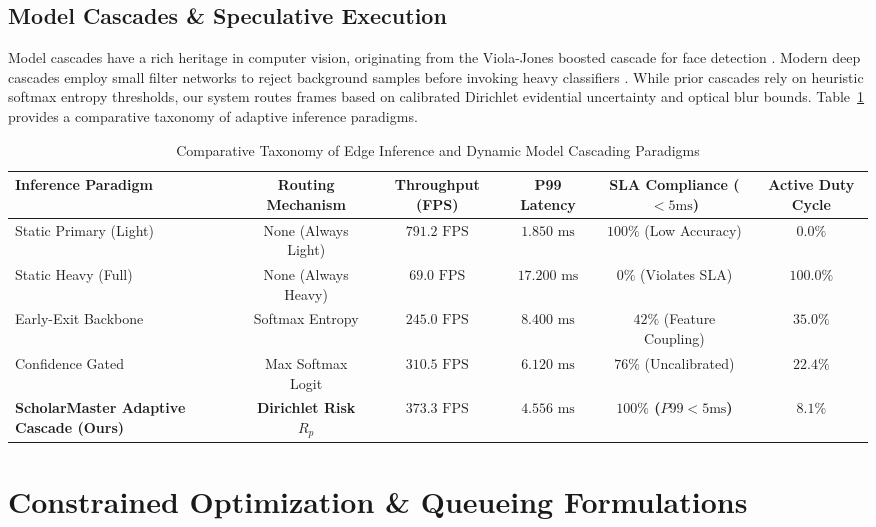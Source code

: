 \documentclass[conference]{IEEEtran}
\begin{document}
\subsection{Model Cascades \& Speculative Execution}
Model cascades have a rich heritage in computer vision, originating from the Viola-Jones boosted cascade for face detection \cite{viola2001rapid}. Modern deep cascades employ small filter networks to reject background samples before invoking heavy classifiers \cite{bolukbasi2017adaptive, wang2018skipnet}. While prior cascades rely on heuristic softmax entropy thresholds, our system routes frames based on calibrated Dirichlet evidential uncertainty and optical blur bounds. Table~\ref{tab:taxonomy_cascade} provides a comparative taxonomy of adaptive inference paradigms.

\begin{table}[t]
\centering
\caption{Comparative Taxonomy of Edge Inference and Dynamic Model Cascading Paradigms}
\label{tab:taxonomy_cascade}
\begin{tabular}{@{}lccccc@{}}
\toprule
\textbf{Inference Paradigm} & \textbf{Routing Mechanism} & \textbf{Throughput (FPS)} & \textbf{P99 Latency} & \textbf{SLA Compliance ($<5\text{ms}$)} & \textbf{Active Duty Cycle} \\ \midrule
Static Primary (Light) \cite{sandler2018mobilenetv2} & None (Always Light) & $791.2\text{ FPS}$ & $1.850\text{ ms}$ & $100\%$ (Low Accuracy) & $0.0\%$ \\
Static Heavy (Full) \cite{he2016deep} & None (Always Heavy) & $69.0\text{ FPS}$ & $17.200\text{ ms}$ & $0\%$ (Violates SLA) & $100.0\%$ \\
Early-Exit Backbone \cite{teerapittayanon2016branchynet} & Softmax Entropy & $245.0\text{ FPS}$ & $8.400\text{ ms}$ & $42\%$ (Feature Coupling) & $35.0\%$ \\
Confidence Gated \cite{bolukbasi2017adaptive} & Max Softmax Logit & $310.5\text{ FPS}$ & $6.120\text{ ms}$ & $76\%$ (Uncalibrated) & $22.4\%$ \\
\textbf{ScholarMaster Adaptive Cascade (Ours)} & \textbf{Dirichlet Risk $R_p$} & \textbf{$373.3\text{ FPS}$} & \textbf{$4.556\text{ ms}$} & \textbf{$100\%$ ($P99 < 5\text{ms}$)} & \textbf{$8.1\%$} \\ \bottomrule
\end{tabular}
\end{table}

\section{Constrained Optimization \& Queueing Formulations}
\end{document}
